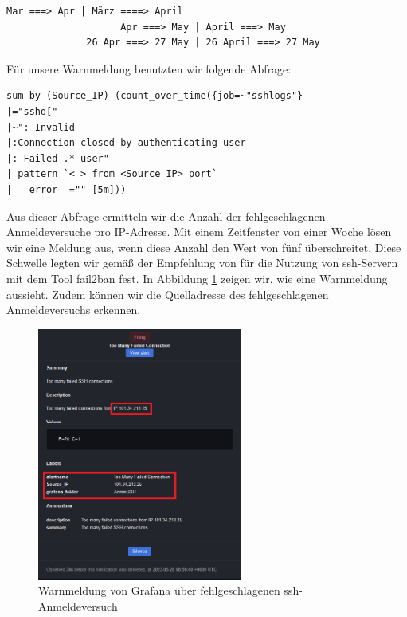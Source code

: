 \begin{center}
{
\begin{Verbatim}[frame=single]
                    Mar ===> Apr | März ====> April
                    Apr ===> May | April ===> May
              26 Apr ===> 27 May | 26 April ===> 27 May
\end{Verbatim}
}
\end{center}

Für unsere Warnmeldung benutzten wir folgende Abfrage:
\begin{center}
{
\begin{Verbatim}[frame=single]
sum by (Source_IP) (count_over_time({job=~"sshlogs"} 
|="sshd[" 
|~": Invalid
|:Connection closed by authenticating user
|: Failed .* user" 
| pattern `<_> from <Source_IP> port` 
| __error__="" [5m]))
\end{Verbatim}
}
\end{center}

Aus dieser Abfrage ermitteln wir die Anzahl der fehlgeschlagenen Anmeldeversuche pro IP-Adresse. Mit einem Zeitfenster von einer Woche lösen wir eine Meldung aus, wenn diese Anzahl den Wert von fünf überschreitet. Diese Schwelle legten wir gemäß der Empfehlung von \cite{RedHat_Passwort} für die Nutzung von \gls{ssh}-Servern mit dem Tool \gls{fail2ban} fest. In Abbildung \ref{fig:unsereWarnmeldung1} zeigen wir, wie eine Warnmeldung aussieht. Zudem können wir die Quelladresse des fehlgeschlagenen Anmeldeversuchs erkennen.

\begin{figure}[H]
  \centering
  \includegraphics[width=0.6\textwidth]{assets/OurAlert.png}
  \caption[Warnmeldung von Grafana über fehlgeschlagenen \gls{ssh}-Anmeldeversuch]
  {Warnmeldung von Grafana über fehlgeschlagenen \gls{ssh}-Anmeldeversuch}
  \centering
  \label{fig:unsereWarnmeldung1}
\end{figure}

